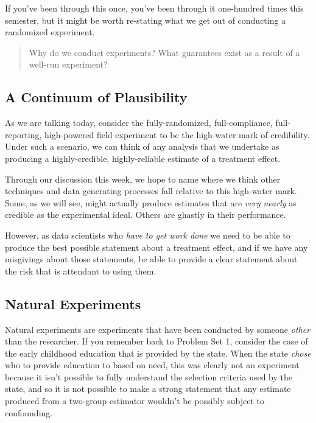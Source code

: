 \documentclass[
]{article}
\theoremstyle{definition}
\theoremstyle{definition}
\theoremstyle{definition}
\theoremstyle{definition}
\theoremstyle{remark}
\begin{document}
If you've been through this once, you've been through it one-hundred times this semester, but it might be worth re-stating what we get out of conducting a randomized experiment.

\begin{quote}
Why do we conduct experiments? What guarantees exist as a result of a well-run experiment?
\end{quote}

\subsection{A Continuum of Plausibility}\label{a-continuum-of-plausibility}

As we are talking today, consider the fully-randomized, full-compliance, full-reporting, high-powered field experiment to be the high-water mark of credibility. Under such a scenario, we can think of any analysis that we undertake as producing a highly-credible, highly-reliable estimate of a treatment effect.

Through our discussion this week, we hope to name where we think other techniques and data generating processes fall relative to this high-water mark. Some, as we will see, might actually produce estimates that are \emph{very nearly} as credible as the experimental ideal. Others are ghastly in their performance.

However, as data scientists who \emph{have to get work done} we need to be able to produce the best possible statement about a treatment effect, and if we have any misgivings about those statements, be able to provide a clear statement about the risk that is attendant to using them.

\subsection{Natural Experiments}\label{natural-experiments}

Natural experiments are experiments that have been conducted by someone \emph{other} than the researcher. If you remember back to Problem Set 1, consider the case of the early childhood education that is provided by the state. When the state \emph{chose} who to provide education to based on need, this was clearly not an experiment because it isn't possible to fully understand the selection criteria used by the state, and so it is not possible to make a strong statement that any estimate produced from a two-group estimator wouldn't be possibly subject to confounding.
\end{document}
